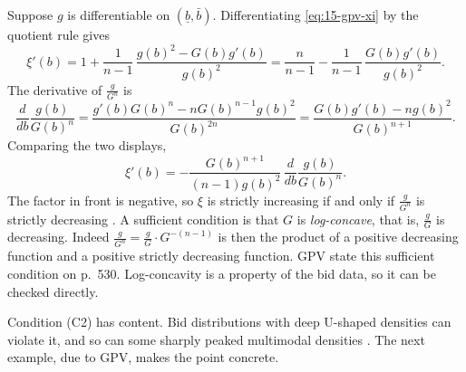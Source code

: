 \begin{remark}\label{rem:15-c2}
Suppose $g$ is differentiable on $(\underline b,\bar b)$. Differentiating \eqref{eq:15-gpv-xi} by the quotient rule gives
\[
\xi'(b)=1+\frac{1}{n-1}\,\frac{g(b)^2-G(b)g'(b)}{g(b)^2}=\frac{n}{n-1}-\frac{1}{n-1}\,\frac{G(b)g'(b)}{g(b)^2}.
\]
The derivative of $\frac{g}{G^n}$ is
\[
\frac{d}{db}\frac{g(b)}{G(b)^n}=\frac{g'(b)G(b)^n-nG(b)^{n-1}g(b)^2}{G(b)^{2n}}=\frac{G(b)g'(b)-ng(b)^2}{G(b)^{n+1}}.
\]
Comparing the two displays,
\[
\xi'(b)=-\frac{G(b)^{n+1}}{(n-1)g(b)^2}\,\frac{d}{db}\frac{g(b)}{G(b)^n}.
\]
The factor in front is negative, so $\xi$ is strictly increasing if and only if $\frac{g}{G^n}$ is strictly decreasing \citep[footnote 6]{GuerrePerrigneVuong2000}. A sufficient condition is that $G$ is \emph{log-concave}, that is, $\frac{g}{G}$ is decreasing. Indeed $\frac{g}{G^n}=\frac{g}{G}\cdot G^{-(n-1)}$ is then the product of a positive decreasing function and a positive strictly decreasing function. GPV state this sufficient condition on p.~530. Log-concavity is a property of the bid data, so it can be checked directly.
\end{remark}

Condition (C2) has content. Bid distributions with deep U-shaped densities can violate it, and so can some sharply peaked multimodal densities \citep[p.~530]{GuerrePerrigneVuong2000}. The next example, due to GPV, makes the point concrete.

